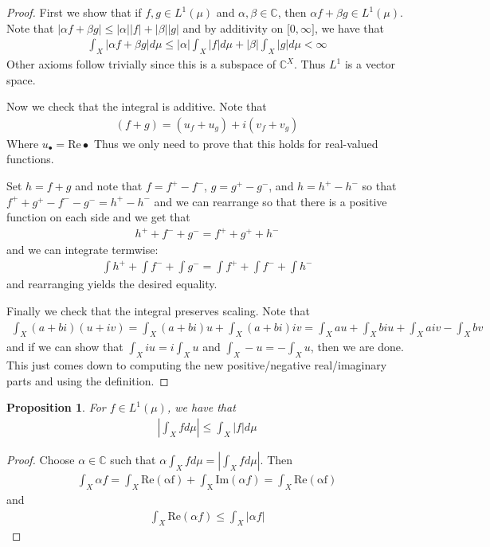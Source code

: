 \documentclass[11pt]{amsart}
\newtheorem{proposition}[theorem]{Proposition}
\theoremstyle{definition}
\numberwithin{equation}{section}
\begin{document}
\begin{proof}
    First we show that if $f,g\in L^1(\mu)$ and $\alpha,\beta\in\mathbb C$, then $\alpha f+\beta g\in L^1(\mu)$. Note that $|\alpha f+\beta g|\le|\alpha||f|+|\beta||g|$ and by additivity on $\mathbb [0,\infty]$, we have that
    \begin{align*}
        \int_X|\alpha f+\beta g|d\mu\le|\alpha|\int_X|f|d\mu+|\beta|\int_X|g|d\mu<\infty
    \end{align*}
    Other axioms follow trivially since this is a subspace of $\mathbb C^X$. Thus $L^1$ is a vector space. 

    Now we check that the integral is additive. Note that
    \begin{align*}
        (f+g)=(u_f+u_g)+i(v_f+v_g)
    \end{align*}
    Where $u_\bullet=\mathrm{Re}\bullet$ Thus we only need to prove that this holds for real-valued functions.

    Set $h=f+g$ and note that $f=f^+-f^-$, $g=g^+-g^-$, and $h=h^+-h^-$ so that $f^++g^+-f^--g^-=h^+-h^-$ and we can rearrange so that there is a positive function on each side and we get that
    \begin{align*}
        h^++f^-+g^-=f^++g^++h^-
    \end{align*}
    and we can integrate termwise:
    \begin{align*}
        \int h^++\int f^-+\int g^-=\int f^++\int f^-+\int h^-
    \end{align*}
    and rearranging yields the desired equality.

    Finally we check that the integral preserves scaling. Note that
    \begin{align*}
        \int_X(a+bi)(u+iv)=\int_X(a+bi)u+\int_X(a+bi)iv=\int_Xau+\int_Xbiu+\int_Xaiv-\int_Xbv
    \end{align*}
    and if we can show that $\int_Xiu=i\int_Xu$ and $\int_X-u=-\int_Xu$, then we are done. This just comes down to computing the new positive/negative real/imaginary parts and using the definition.
\end{proof}
\begin{proposition}
    For $f\in L^1(\mu)$, we have that
    \begin{align*}
        \left|\int_Xfd\mu\right|\le\int_X|f|d\mu
    \end{align*}
\end{proposition}
\begin{proof}
    Choose $\alpha\in\mathbb C$ such that $\alpha\int_Xfd\mu=|\int_X fd\mu|$. Then
    \begin{align*}
        \int_X\alpha f=\int_X\mathrm{Re(\alpha f)+\int_X}\mathrm{Im}(\alpha f)=\int_X\mathrm{Re(\alpha f)}
    \end{align*}
    and
    \begin{align*}
        \int_X\mathrm{Re}(\alpha f)\le\int_X|\alpha f|
    \end{align*}
\end{proof}
\end{document}
